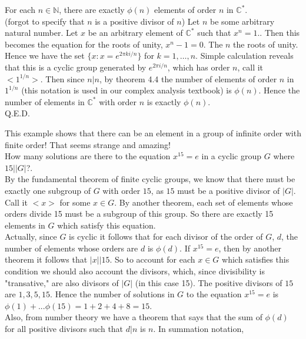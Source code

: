 \documentclass{article}
\newcommand{\N}{\mathbb{N}}
\newcommand{\C}{\mathbb{C}}
\begin{document}
 For each $n\in \N$, there are exactly $\phi(n)$ elements of order $n$ in $\C^*$. \\

 (forgot to specify that $n$ is a positive divisor of $n$) Let $n$ be some arbitrary natural number. Let $x$ be an arbitrary element of $\C^*$ such that $x^n = 1$.. Then this becomes the equation for the roots of unity, $x^n - 1 = 0$. The $n$ the roots of unity. Hence we have the set $\{x: x = e^{2\pi k i/n} \}$ for $k = 1,\dots,n$. Simple calculation reveals that this is a cyclic group generated by $e^{2\pi i/n}$, which has order $n$, call it $<1^{1/n}>$. Then since $n|n$, by theorem 4.4 the number of elements of order $n$ in $1^{1/n}$ (this notation is used in our complex analysis textbook) is $\phi(n)$. Hence the number of elements in $\C^*$ with order $n$ is exactly $\phi(n)$.\\

Q.E.D.

 This example shows that there can be an element in a group of infinite order with finite order! That seems strange and amazing!\\

 How many solutions are there to the equation $x^{15} = e$ in a cyclic group $G$ where $15||G|$?.\\

 By the fundamental theorem of finite cyclic groups, we know that there must be exactly one subgroup of $G$ with order $15$, as $15$ must be a positive divisor of $|G|$. Call it $<x>$ for some $x\in G$. By another theorem, each set of elements whose orders divide 15 must be a subgroup of this group. So there are exactly 15 elements in $G$ which satisfy this equation.\\

Actually, since $G$ is cyclic it follows that for each divisor of the order of $G$, $d$, the number of elements whose orders are $d$ is $\phi(d)$. If $x^{15} = e$, then by another theorem it follows that $|x| | 15$. So to account for each $x\in G$ which satisfies this condition we should also account the divisors, which, since divisibility is "transative," are also divisors of $|G|$ (in this case 15). The positive divisors of $15$ are $1,3,5,15$. Hence the number of solutions in $G$ to the equation $x^{15} = e$ is $\phi(1) + ...\phi(15) = 1+ 2+ 4+ 8 = 15$. \\

Also, from number theory we have a theorem that says that the sum of $\phi(d)$ for all positive divisors such that $d|n$ is $n$. In summation notation, 
\end{document}
